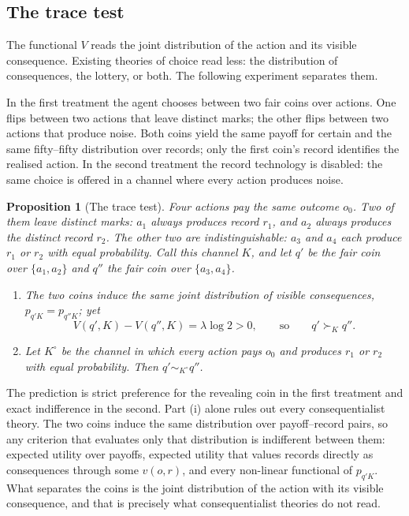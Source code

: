\documentclass[11pt,a4paper]{article}
\newtheorem{proposition}[theorem]{Proposition}
\theoremstyle{definition}
\newcommand{\1}{\mathbf 1}
\begin{document}
\subsection{The trace test}\label{sec:tracetest}

The functional $V$ reads the joint distribution of the action and its visible consequence.  Existing theories of
choice read less: the distribution of consequences, the lottery, or both.  The following experiment separates
them.

In the first treatment the agent chooses between two fair coins over actions.  One flips between two actions
that leave distinct marks; the other flips between two actions that produce noise.  Both coins yield the same
payoff for certain and the same fifty--fifty distribution over records; only the first coin's record identifies
the realised action.  In the second treatment the record technology is disabled: the same choice is offered in a
channel where every action produces noise.

\begin{proposition}[The trace test]\label{prop:signature}
Four actions pay the same outcome $o_0$.  Two of them leave distinct marks: $a_1$ always produces record $r_1$,
and $a_2$ always produces the distinct record $r_2$.  The other two are indistinguishable: $a_3$ and $a_4$ each
produce $r_1$ or $r_2$ with equal probability.  Call this channel $K$, and let $q'$ be the fair coin over
$\{a_1,a_2\}$ and $q''$ the fair coin over $\{a_3,a_4\}$.
\begin{enumerate}[label=\textup{(\roman*)},leftmargin=*]
\item The two coins induce the same joint distribution of visible consequences, $p_{q'K}=p_{q''K}$; yet
\[
 V(q',K)-V(q'',K)=\lambda\log2>0,
 \qquad\text{so}\qquad
 q'\succ_Kq''.
\]
\item Let $K^\circ$ be the channel in which every action pays $o_0$ and produces $r_1$ or $r_2$ with equal
probability.  Then $q'\sim_{K^\circ}q''$.
\end{enumerate}
\end{proposition}

The prediction is strict preference for the revealing coin in the first treatment and exact indifference in the
second.  Part \textup{(i)} alone rules out every consequentialist theory.  The two coins induce the same
distribution over payoff--record pairs, so any criterion that evaluates only that distribution is indifferent
between them: expected utility over payoffs, expected utility that values records directly as consequences
through some $v(o,r)$, and every non-linear functional of $p_{q'K}$.  What separates the coins is the joint
distribution of the action with its visible consequence, and that is precisely what consequentialist theories do
not read.
\end{document}
